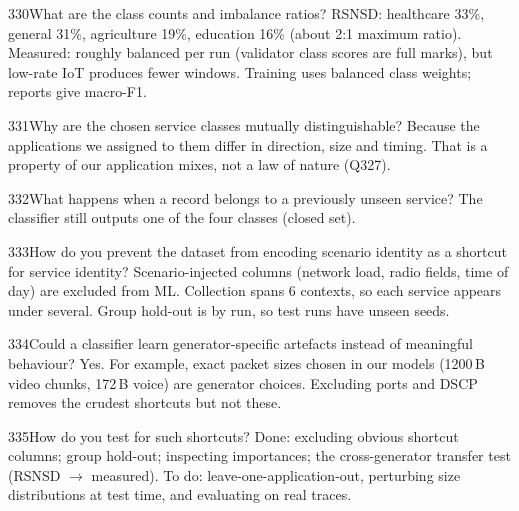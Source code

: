 \begin{qa}{330}{What are the class counts and imbalance ratios?}
RSNSD: healthcare 33\%, general 31\%, agriculture 19\%, education 16\% (about 2:1 maximum ratio). Measured:
roughly balanced per run (validator class scores are full marks), but low-rate IoT produces fewer windows. Training uses
balanced class weights; reports give macro-F1.
\end{qa}

\begin{qa}{331}{Why are the chosen service classes mutually distinguishable?}
Because the applications we assigned to them differ in direction, size and timing. That is a property of our
application mixes, not a law of nature (Q327).
\end{qa}

\begin{qa}{332}{What happens when a record belongs to a previously unseen service?}
The classifier still outputs one of the four classes (closed set).
\end{qa}

\begin{qa}{333}{How do you prevent the dataset from encoding scenario identity as a shortcut for service identity?}
Scenario-injected columns (network load, radio fields, time of day) are excluded from ML. Collection spans 6 contexts,
so each service appears under several. Group hold-out is by run, so test runs have unseen seeds.
\end{qa}

\begin{qa}{334}{Could a classifier learn generator-specific artefacts instead of meaningful behaviour?}
Yes. For example, exact packet sizes chosen in our models (1200\,B video chunks, 172\,B voice) are generator choices.
Excluding ports and DSCP removes the crudest shortcuts but not these.
\end{qa}

\begin{qa}{335}{How do you test for such shortcuts?}
Done: excluding obvious shortcut columns; group hold-out; inspecting importances; the cross-generator transfer test
(RSNSD $\rightarrow$ measured). To do: leave-one-application-out, perturbing size distributions at test time, and
evaluating on real traces.
\end{qa}

